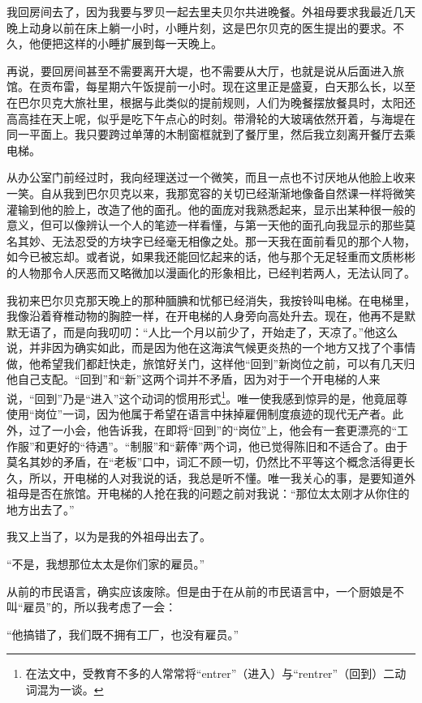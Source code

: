 \par 我回房间去了，因为我要与罗贝一起去里夫贝尔共进晚餐。外祖母要求我最近几天晚上动身以前在床上躺一小时，小睡片刻，这是巴尔贝克的医生提出的要求。不久，他便把这样的小睡扩展到每一天晚上。
\par 再说，要回房间甚至不需要离开大堤，也不需要从大厅，也就是说从后面进入旅馆。在贡布雷，每星期六午饭提前一小时。现在这里正是盛夏，白天那么长，以至在巴尔贝克大旅社里，根据与此类似的提前规则，人们为晚餐摆放餐具时，太阳还高高挂在天上呢，似乎是吃下午点心的时刻。带滑轮的大玻璃依然开着，与海堤在同一平面上。我只要跨过单薄的木制窗框就到了餐厅里，然后我立刻离开餐厅去乘电梯。
\par 从办公室门前经过时，我向经理送过一个微笑，而且一点也不讨厌地从他脸上收来一笑。自从我到巴尔贝克以来，我那宽容的关切已经渐渐地像备自然课一样将微笑灌输到他的脸上，改造了他的面孔。他的面庞对我熟悉起来，显示出某种很一般的意义，但可以像辨认一个人的笔迹一样看懂，与第一天他的面孔向我显示的那些莫名其妙、无法忍受的方块字已经毫无相像之处。那一天我在面前看见的那个人物，如今已被忘却。或者说，如果我还能回忆起来的话，他与那个无足轻重而文质彬彬的人物那令人厌恶而又略微加以漫画化的形象相比，已经判若两人，无法认同了。
\par 我初来巴尔贝克那天晚上的那种腼腆和忧郁已经消失，我按铃叫电梯。在电梯里，我像沿着脊椎动物的胸腔一样，在开电梯的人身旁向高处升去。现在，他再不是默默无语了，而是向我叨叨：“人比一个月以前少了，开始走了，天凉了。”他这么说，并非因为确实如此，而是因为他在这海滨气候更炎热的一个地方又找了个事情做，他希望我们都赶快走，旅馆好关门，这样他“回到”新岗位之前，可以有几天归他自己支配。“回到”和“新”这两个词并不矛盾，因为对于一个开电梯的人来说，“回到”乃是“进入”这个动词的惯用形式\footnote{在法文中，受教育不多的人常常将“entrer”（进入）与“rentrer”（回到）二动词混为一谈。}。唯一使我感到惊异的是，他竟屈尊使用“岗位”一词，因为他属于希望在语言中抹掉雇佣制度痕迹的现代无产者。此外，过了一小会，他告诉我，在即将“回到”的“岗位”上，他会有一套更漂亮的“工作服”和更好的“待遇”。“制服”和“薪俸”两个词，他已觉得陈旧和不适合了。由于莫名其妙的矛盾，在“老板”口中，词汇不顾一切，仍然比不平等这个概念活得更长久，所以，开电梯的人对我说的话，我总是听不懂。唯一我关心的事，是要知道外祖母是否在旅馆。开电梯的人抢在我的问题之前对我说：“那位太太刚才从你住的地方出去了。”
\par 我又上当了，以为是我的外祖母出去了。
\par “不是，我想那位太太是你们家的雇员。”
\par 从前的市民语言，确实应该废除。但是由于在从前的市民语言中，一个厨娘是不叫“雇员”的，所以我考虑了一会：
\par “他搞错了，我们既不拥有工厂，也没有雇员。”
